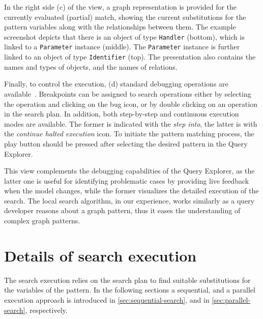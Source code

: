 In the right side (c) of the view, a graph representation is provided for the currently evaluated (partial) match, showing the current substitutions for the pattern variables along with the relationships between them. The example screenshot depicts that there is an object of type \texttt{Handler} (bottom), which is linked to a \texttt{Parameter} instance (middle). The \texttt{Parameter} instance is further linked to an object of type \texttt{Identifier} (top). The presentation also contains the names and types of objects, and the names of relations.

Finally, to control the execution, (d) standard debugging operations are available~\cite{seifert2008debugging}. Breakpoints can be assigned to search operations either by selecting the operation and clicking on the bug icon, or by double clicking on an operation in the search plan. In addition, both step-by-step and continuous execution modes are available. The former is indicated with the \emph{step into}, the latter is with the \emph{continue halted execution} icon. To initiate the pattern matching process, the play button should be pressed after selecting the desired pattern in the Query Explorer.

This view complements the debugging capabilities of the Query Explorer, as the latter one is useful for identifying problematic cases by providing live feedback when the model changes, while the former visualizes the detailed execution of the search. The local search algorithm, in our experience, works similarly as a query developer reasons about a graph pattern, thus it eases the understanding of complex graph patterns.

\section{Details of search execution}
\label{sec:search-execution}


The search execution relies on the search plan to find suitable substitutions for the variables of the pattern. In the following sections a sequential, and a parallel execution approach is introduced in \autoref{sec:sequential-search}, and in \autoref{sec:parallel-search}, respectively.


